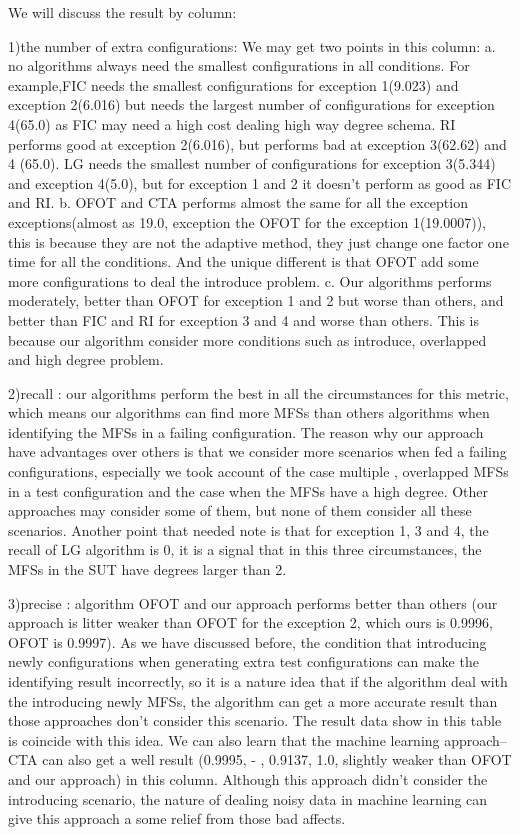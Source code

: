 \documentclass[10pt,journal,cspaper,compsoc]{IEEEtran}
\begin{document}
 We will discuss the result by column:

 1)the number of extra configurations: We may get two points in this column: a. no algorithms always need the smallest configurations in all conditions. For example,FIC needs the smallest configurations for exception 1(9.023) and exception 2(6.016) but needs the largest number of configurations for exception 4(65.0) as FIC may need a high cost dealing high way degree schema.  RI performs good at exception 2(6.016), but performs bad at exception 3(62.62) and 4 (65.0).  LG needs the smallest number of configurations for exception 3(5.344) and exception 4(5.0), but for exception 1 and 2 it doesn't perform as good as FIC and RI.  b. OFOT and CTA performs almost the same for all the exception exceptions(almost as 19.0, exception the OFOT for the exception 1(19.0007)), this is because they are not the adaptive method, they just change one factor one time for all the conditions. And the unique different is that OFOT add some more configurations to deal the introduce problem. c. Our algorithms performs moderately, better than OFOT for exception 1 and 2 but worse than others, and better than FIC and RI for exception 3 and 4 and worse than others. This is because our algorithm consider more conditions such as introduce, overlapped and high degree problem.

 2)recall : our algorithms perform the best in all the circumstances for this metric, which means our algorithms can find more MFSs than others algorithms when identifying the MFSs in a failing configuration. The reason why our approach have advantages over others is that we consider more scenarios when fed a failing configurations, especially we took account of the case multiple , overlapped MFSs in a test configuration and the case when the MFSs have a high degree. Other approaches may consider some of them, but none of them consider all these scenarios. Another point that needed note is that for exception 1, 3 and 4, the recall of LG algorithm is 0, it is a signal that in this three circumstances, the MFSs in the SUT have degrees larger than 2.

 3)precise : algorithm OFOT and our approach performs better than others (our approach is litter weaker than OFOT for the exception 2, which ours is 0.9996, OFOT is 0.9997). As we have discussed before, the condition that introducing newly configurations when generating extra test configurations can make the identifying result incorrectly, so it is a nature idea that if the algorithm deal with the introducing newly MFSs, the algorithm can get a more accurate result than those approaches don't consider this scenario. The result data show in this table is coincide with this idea. We can also learn that the machine learning approach-- CTA can also get a well result (0.9995, - , 0.9137, 1.0, slightly weaker than OFOT and our approach) in this column. Although this approach didn't consider the introducing scenario, the nature of dealing noisy data in machine learning can give this approach a some relief from those bad affects.
\end{document}

